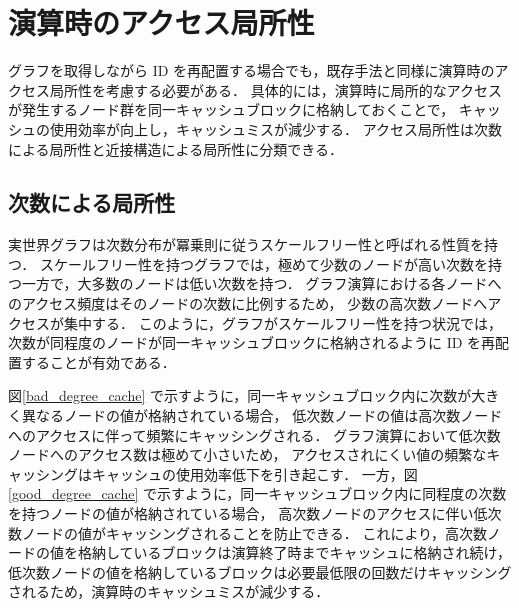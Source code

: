 \section{演算時のアクセス局所性}
グラフを取得しながら ID を再配置する場合でも，既存手法と同様に演算時のアクセス局所性を考慮する必要がある．
具体的には，演算時に局所的なアクセスが発生するノード群を同一キャッシュブロックに格納しておくことで，
キャッシュの使用効率が向上し，キャッシュミスが減少する．
アクセス局所性は次数による局所性と近接構造による局所性に分類できる．
\subsection{次数による局所性}
実世界グラフは次数分布が冪乗則に従うスケールフリー性と呼ばれる性質を持つ\cite{barabasi1999emergence,faloutsos1999power,clauset2009power}．
スケールフリー性を持つグラフでは，極めて少数のノードが高い次数を持つ一方で，大多数のノードは低い次数を持つ．
グラフ演算における各ノードへのアクセス頻度はそのノードの次数に比例するため，
少数の高次数ノードへアクセスが集中する．
このように，グラフがスケールフリー性を持つ状況では，次数が同程度のノードが同一キャッシュブロックに格納されるように ID を再配置することが有効である．

図\ref{bad_degree_cache} で示すように，同一キャッシュブロック内に次数が大きく異なるノードの値が格納されている場合，
低次数ノードの値は高次数ノードへのアクセスに伴って頻繁にキャッシングされる．
グラフ演算において低次数ノードへのアクセス数は極めて小さいため，
アクセスされにくい値の頻繁なキャッシングはキャッシュの使用効率低下を引き起こす．
一方，図\ref{good_degree_cache} で示すように，同一キャッシュブロック内に同程度の次数を持つノードの値が格納されている場合，
高次数ノードのアクセスに伴い低次数ノードの値がキャッシングされることを防止できる．
これにより，高次数ノードの値を格納しているブロックは演算終了時までキャッシュに格納され続け，
低次数ノードの値を格納しているブロックは必要最低限の回数だけキャッシングされるため，演算時のキャッシュミスが減少する．


